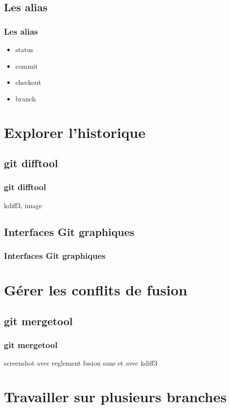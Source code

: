 \documentclass[t,11pt]{beamer}
\begin{document}
\subsection{Les alias}
\begin{frame}
        \frametitle{Les alias}
        \begin{itemize}
                \item status
                \item commit
                \item checkout
                \item branch
        \end{itemize}
\end{frame}

\section{Explorer l'historique}
\subsection{git difftool}
\begin{frame}
        \frametitle{git difftool}
        kdiff3, image
\end{frame}

\subsection{Interfaces Git graphiques}
\begin{frame}
        \frametitle{Interfaces Git graphiques}
\end{frame}


\section{G\'erer les conflits de fusion}
\subsection{git mergetool}
\begin{frame}
        \frametitle{git mergetool}
        screenshot avec reglement fusion
        sans et avec kdiff3
\end{frame}

\section{Travailler sur plusieurs branches}
\end{document}
